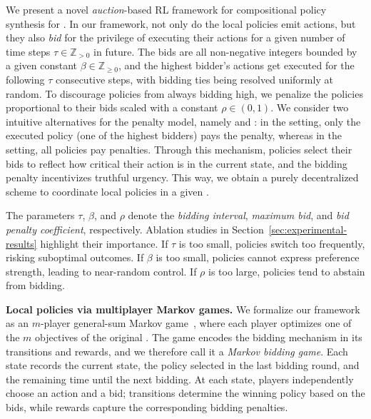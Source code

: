 We present a novel \textit{auction}-based RL framework for compositional policy synthesis for \momdps.
In our framework, not only do the local policies emit actions, but they also \emph{bid} for the privilege of executing their actions for a given number of time steps $\tau\in \mathbb{Z}_{>0}$ in future.
The bids are all non-negative integers bounded by a given constant $\beta\in \mathbb{Z}_{\geq 0}$, and the highest bidder's actions get executed for the following $\tau$ consecutive steps, with bidding ties being resolved uniformly at random.
To discourage policies from always bidding high, we penalize the policies proportional to their bids scaled with a constant $\rho\in (0,1)$.
We consider two intuitive alternatives for the penalty model, namely \poorman and \allpay:
in the \poorman setting, only the executed policy (one of the highest bidders) pays the penalty, whereas in the \allpay setting, all policies pay penalties.
Through this mechanism, policies select their bids to reflect how critical their action is in the current state, and the bidding penalty incentivizes truthful urgency.
This way, we obtain a purely decentralized scheme to coordinate local policies in a given \momdp.

The parameters $\tau$, $\beta$, and $\rho$ denote the \emph{bidding interval}, \emph{maximum bid}, and \emph{bid penalty coefficient}, respectively. Ablation studies in Section~\ref{sec:experimental-results} highlight their importance. If $\tau$ is too small, policies switch too frequently, risking suboptimal outcomes. If $\beta$ is too small, policies cannot express preference strength, leading to near-random control. If $\rho$ is too large, policies tend to abstain from bidding.

\textbf{Local policies via multiplayer Markov games.}
We formalize our framework as an $m$-player general-sum Markov game~\citep{littman1994markov}, where each player optimizes one of the $m$ objectives of the original \momdp. The game encodes the bidding mechanism in its transitions and rewards, and we therefore call it a \textit{Markov bidding game}. Each state records the current \momdp state, the policy selected in the last bidding round, and the remaining time until the next bidding. At each state, players independently choose an action and a bid; transitions determine the winning policy based on the bids, while rewards capture the corresponding bidding penalties. 



